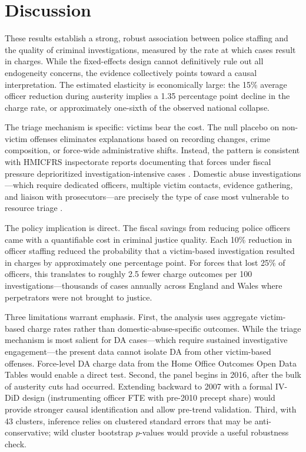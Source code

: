 \documentclass[12pt]{article}
\begin{document}


\section{Discussion}

These results establish a strong, robust association between police staffing and the quality of criminal investigations, measured by the rate at which cases result in charges. While the fixed-effects design cannot definitively rule out all endogeneity concerns, the evidence collectively points toward a causal interpretation. The estimated elasticity is economically large: the 15\% average officer reduction during austerity implies a 1.35 percentage point decline in the charge rate, or approximately one-sixth of the observed national collapse.

The triage mechanism is specific: victims bear the cost. The null placebo on non-victim offenses eliminates explanations based on recording changes, crime composition, or force-wide administrative shifts. Instead, the pattern is consistent with HMICFRS inspectorate reports documenting that forces under fiscal pressure deprioritized investigation-intensive cases \citep{hmicfrs2019}. Domestic abuse investigations---which require dedicated officers, multiple victim contacts, evidence gathering, and liaison with prosecutors---are precisely the type of case most vulnerable to resource triage \citep{hester2006}.

The policy implication is direct. The fiscal savings from reducing police officers came with a quantifiable cost in criminal justice quality. Each 10\% reduction in officer staffing reduced the probability that a victim-based investigation resulted in charges by approximately one percentage point. For forces that lost 25\% of officers, this translates to roughly 2.5 fewer charge outcomes per 100 investigations---thousands of cases annually across England and Wales where perpetrators were not brought to justice.

Three limitations warrant emphasis. First, the analysis uses aggregate victim-based charge rates rather than domestic-abuse-specific outcomes. While the triage mechanism is most salient for DA cases---which require sustained investigative engagement---the present data cannot isolate DA from other victim-based offenses. Force-level DA charge data from the Home Office Outcomes Open Data Tables would enable a direct test. Second, the panel begins in 2016, after the bulk of austerity cuts had occurred. Extending backward to 2007 with a formal IV-DiD design (instrumenting officer FTE with pre-2010 precept share) would provide stronger causal identification and allow pre-trend validation. Third, with 43 clusters, inference relies on clustered standard errors that may be anti-conservative; wild cluster bootstrap $p$-values would provide a useful robustness check.
\end{document}
